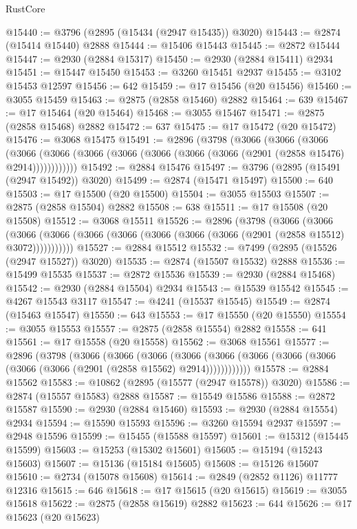 \begin{lexlean}{RustCore}
\begin{coremodule}
@15440 := @3796 (@2895 (@15434 (@2947 @15435)) @3020)
@15443 := @2874 (@15414 @15440) @2888
@15444 := @15406 @15443
@15445 := @2872 @15444
@15447 := @2930 (@2884 @15317)
@15450 := @2930 (@2884 @15411) @2934
@15451 := @15447 @15450
@15453 := @3260 @15451 @2937
@15455 := @3102 @15453 @12597
@15456 := 642
@15459 := @17 @15456 (@20 @15456)
@15460 := @3055 @15459
@15463 := @2875 (@2858 @15460) @2882
@15464 := 639
@15467 := @17 @15464 (@20 @15464)
@15468 := @3055 @15467
@15471 := @2875 (@2858 @15468) @2882
@15472 := 637
@15475 := @17 @15472 (@20 @15472)
@15476 := @3068 @15475
@15491 := @2896
    (@3798
      (@3066
        (@3066
          (@3066
            (@3066 (@3066 (@3066 (@3066 (@3066 (@3066 (@3066 (@2901 (@2858 @15476) @2914))))))))))))
@15492 := @2884 @15476
@15497 := @3796 (@2895 (@15491 (@2947 @15492)) @3020)
@15499 := @2874 (@15471 @15497)
@15500 := 640
@15503 := @17 @15500 (@20 @15500)
@15504 := @3055 @15503
@15507 := @2875 (@2858 @15504) @2882
@15508 := 638
@15511 := @17 @15508 (@20 @15508)
@15512 := @3068 @15511
@15526 := @2896
    (@3798
      (@3066
        (@3066
          (@3066 (@3066 (@3066 (@3066 (@3066 (@3066 (@3066 (@2901 (@2858 @15512) @3072)))))))))))
@15527 := @2884 @15512
@15532 := @7499 (@2895 (@15526 (@2947 @15527)) @3020)
@15535 := @2874 (@15507 @15532) @2888
@15536 := @15499 @15535
@15537 := @2872 @15536
@15539 := @2930 (@2884 @15468)
@15542 := @2930 (@2884 @15504) @2934
@15543 := @15539 @15542
@15545 := @4267 @15543 @3117
@15547 := @4241 (@15537 @15545)
@15549 := @2874 (@15463 @15547)
@15550 := 643
@15553 := @17 @15550 (@20 @15550)
@15554 := @3055 @15553
@15557 := @2875 (@2858 @15554) @2882
@15558 := 641
@15561 := @17 @15558 (@20 @15558)
@15562 := @3068 @15561
@15577 := @2896
    (@3798
      (@3066
        (@3066
          (@3066
            (@3066 (@3066 (@3066 (@3066 (@3066 (@3066 (@3066 (@2901 (@2858 @15562) @2914))))))))))))
@15578 := @2884 @15562
@15583 := @10862 (@2895 (@15577 (@2947 @15578)) @3020)
@15586 := @2874 (@15557 @15583) @2888
@15587 := @15549 @15586
@15588 := @2872 @15587
@15590 := @2930 (@2884 @15460)
@15593 := @2930 (@2884 @15554) @2934
@15594 := @15590 @15593
@15596 := @3260 @15594 @2937
@15597 := @2948 @15596
@15599 := @15455 (@15588 @15597)
@15601 := @15312 (@15445 @15599)
@15603 := @15253 (@15302 @15601)
@15605 := @15194 (@15243 @15603)
@15607 := @15136 (@15184 @15605)
@15608 := @15126 @15607
@15610 := @2734 (@15078 @15608)
@15614 := @2849 (@2852 @1126) @11777 @12316
@15615 := 646
@15618 := @17 @15615 (@20 @15615)
@15619 := @3055 @15618
@15622 := @2875 (@2858 @15619) @2882
@15623 := 644
@15626 := @17 @15623 (@20 @15623)

\end{coremodule}
\end{lexlean}
